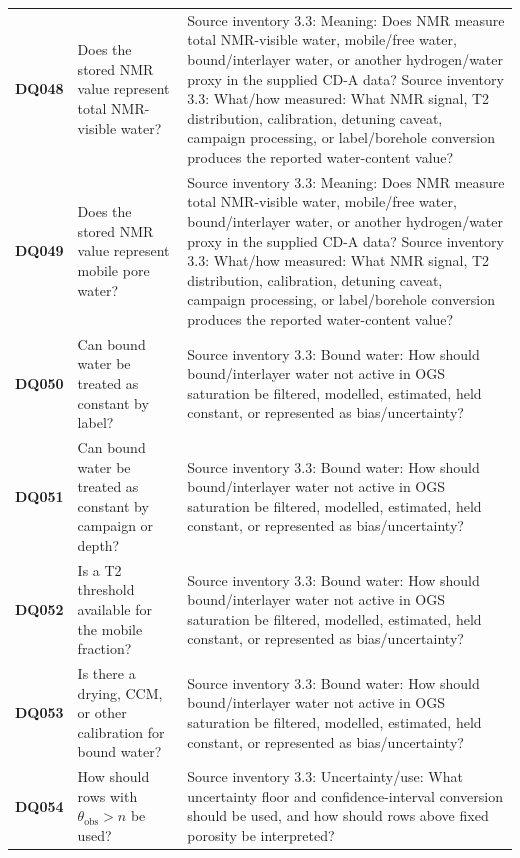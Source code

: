 \begin{longtable}{@{}L{0.09\textwidth} L{0.31\textwidth} L{0.52\textwidth}@{}}
\textbf{DQ048} & Does the stored NMR value represent total NMR-visible water? & Source inventory 3.3: Meaning: Does NMR measure total NMR-visible water, mobile/free water, bound/interlayer water, or another hydrogen/water proxy in the supplied CD-A data? Source inventory 3.3: What/how measured: What NMR signal, T2 distribution, calibration, detuning caveat, campaign processing, or label/borehole conversion produces the reported water-content value?\\
\addlinespace[0.18em]
\textbf{DQ049} & Does the stored NMR value represent mobile pore water? & Source inventory 3.3: Meaning: Does NMR measure total NMR-visible water, mobile/free water, bound/interlayer water, or another hydrogen/water proxy in the supplied CD-A data? Source inventory 3.3: What/how measured: What NMR signal, T2 distribution, calibration, detuning caveat, campaign processing, or label/borehole conversion produces the reported water-content value?\\
\addlinespace[0.18em]
\textbf{DQ050} & Can bound water be treated as constant by label? & Source inventory 3.3: Bound water: How should bound/interlayer water not active in OGS saturation be filtered, modelled, estimated, held constant, or represented as bias/uncertainty?\\
\addlinespace[0.18em]
\textbf{DQ051} & Can bound water be treated as constant by campaign or depth? & Source inventory 3.3: Bound water: How should bound/interlayer water not active in OGS saturation be filtered, modelled, estimated, held constant, or represented as bias/uncertainty?\\
\addlinespace[0.18em]
\textbf{DQ052} & Is a T2 threshold available for the mobile fraction? & Source inventory 3.3: Bound water: How should bound/interlayer water not active in OGS saturation be filtered, modelled, estimated, held constant, or represented as bias/uncertainty?\\
\addlinespace[0.18em]
\textbf{DQ053} & Is there a drying, CCM, or other calibration for bound water? & Source inventory 3.3: Bound water: How should bound/interlayer water not active in OGS saturation be filtered, modelled, estimated, held constant, or represented as bias/uncertainty?\\
\addlinespace[0.18em]
\textbf{DQ054} & How should rows with \(\theta_{\mathrm{obs}}>n\) be used? & Source inventory 3.3: Uncertainty/use: What uncertainty floor and confidence-interval conversion should be used, and how should rows above fixed porosity be interpreted?\\

\end{longtable}

